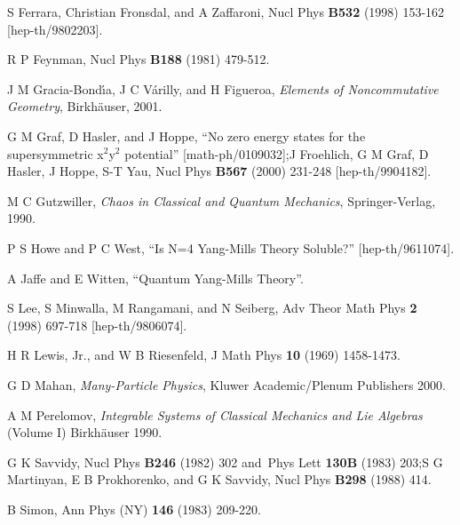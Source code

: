 \documentclass[a4paper,12pt]{article}%
\begin{document}
\begin{thebibliography}{9}
S Ferrara, Christian Fronsdal, and A Zaffaroni, Nucl Phys
\textbf{B532} (1998) 153-162 [hep-th/9802203].

R P Feynman, Nucl Phys \textbf{B188} (1981) 479-512.

J M Gracia-Bond\'{\i}a, J C V\'{a}rilly, and H Figueroa,
\textit{Elements of Noncommutative Geometry}, Birkh\"{a}user, 2001.

G M Graf, D Hasler, and J Hoppe, ``No zero energy states for
the supersymmetric x$^{2}$y$^{2}$ potential'' [math-ph/0109032];\newline J
Froehlich, G M Graf, D Hasler, J Hoppe, S-T Yau, Nucl Phys \textbf{B567}
(2000) 231-248 [hep-th/9904182].

M C Gutzwiller, \textit{Chaos in Classical and Quantum
Mechanics}, Springer-Verlag, 1990.

P S Howe and P C West, ``Is N=4 Yang-Mills Theory Soluble?'' [hep-th/9611074].

A Jaffe and E Witten, ``Quantum Yang-Mills Theory''.

S Lee, S Minwalla, M Rangamani, and N Seiberg, Adv Theor Math
Phys \textbf{2} (1998) 697-718 [hep-th/9806074].

H R Lewis, Jr., and W B Riesenfeld, J Math Phys \textbf{10}
(1969) 1458-1473.

G D Mahan, \textit{Many-Particle Physics}, Kluwer
Academic/Plenum Publishers 2000.

A M Perelomov, \textit{Integrable Systems of Classical
Mechanics and Lie Algebras} (Volume I) Birkh\"{a}user 1990.

G K Savvidy, Nucl Phys \textbf{B246} (1982) 302 and\ Phys
Lett \textbf{130B} (1983) 203;\newline S G Martinyan, E B Prokhorenko, and G K
Savvidy, Nucl Phys \textbf{B298} (1988) 414.

B Simon, Ann Phys (NY) \textbf{146 }(1983) 209-220.
\end{thebibliography}
\end{document}
